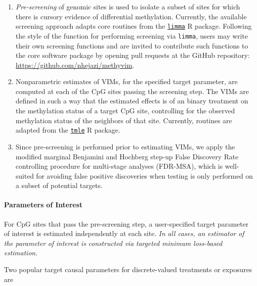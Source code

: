 \documentclass[9pt,a4paper,]{extarticle}
\theoremstyle{definition}
\theoremstyle{definition}
\theoremstyle{definition}
\theoremstyle{remark}
\begin{document}
\begin{enumerate}
\def\labelenumi{\arabic{enumi}.}
\item
  \emph{Pre-screening} of genomic sites is used to isolate a subset of sites for
  which there is cursory evidence of differential methylation. Currently, the
  available screening approach adapts core routines from the
  \href{http://bioconductor.org/packages/limma}{\texttt{limma}} R package. Following the
  style of the function for performing screening via \texttt{limma}, users may write
  their own screening functions and are invited to contribute such functions to
  the core software package by opening pull requests at the GitHub repository:
  \url{https://github.com/nhejazi/methyvim}.
\item
  Nonparametric estimates of VIMs, for the specified target parameter, are
  computed at each of the CpG sites passing the screening step. The VIMs are
  defined in such a way that the estimated effects is of an binary treatment on
  the methylation status of a target CpG site, controlling for the observed
  methylation status of the neighbors of that site. Currently, routines are
  adapted from the \href{https://CRAN.R-project.org/package=tmle}{\texttt{tmle}} R package.
\item
  Since pre-screening is performed prior to estimating VIMs, we apply the
  modified marginal Benjamini and Hochberg step-up False Discovery Rate
  controlling procedure for multi-stage analyses (FDR-MSA), which is
  well-suited for avoiding false positive discoveries when testing is only
  performed on a subset of potential targets.
\end{enumerate}

\hypertarget{parameters-of-interest}{%
\paragraph{Parameters of Interest}\label{parameters-of-interest}}

For CpG sites that pass the pre-screening step, a user-specified target
parameter of interest is estimated independently at each site. \emph{In all cases,
an estimator of the parameter of interest is constructed via targeted minimum
loss-based estimation}.

Two popular target causal parameters for discrete-valued treatments or
exposures are
\end{document}
